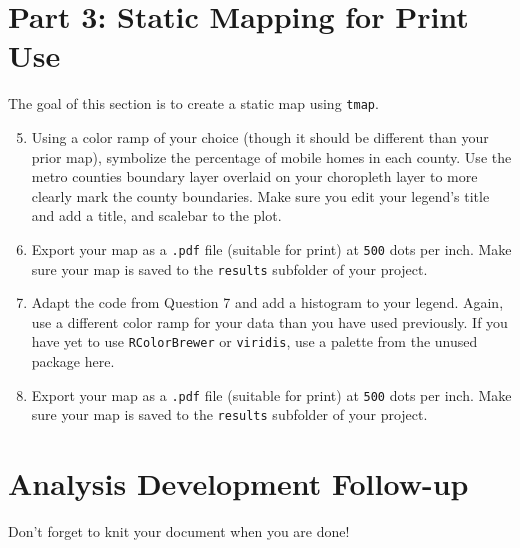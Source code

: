 \documentclass{tufte-handout}
\begin{document}
\section{Part 3: Static Mapping for Print Use}
The goal of this section is to create a static map using \texttt{tmap}. 
\begin{enumerate}
\setcounter{enumi}{4}
\item Using a color ramp of your choice (though it should be different than your prior map), symbolize the percentage of mobile homes in each county. Use the metro counties boundary layer overlaid on your choropleth layer to more clearly mark the county boundaries. Make sure you edit your legend's title and add a title, and scalebar to the plot.
\item Export your map as a \texttt{.pdf} file (suitable for print) at \texttt{500} dots per inch. Make sure your map is saved to the \texttt{results} subfolder of your project.
\item Adapt the code from Question 7 and add a histogram to your legend. Again, use a different color ramp for your data than you have used previously. If you have yet to use \texttt{RColorBrewer} or \texttt{viridis}, use a palette from the unused package here.
\item Export your map as a \texttt{.pdf} file (suitable for print) at \texttt{500} dots per inch. Make sure your map is saved to the \texttt{results} subfolder of your project.
\end{enumerate}

\vspace{5mm}
\section{Analysis Development Follow-up}
Don't forget to knit your document when you are done!


\end{document}
